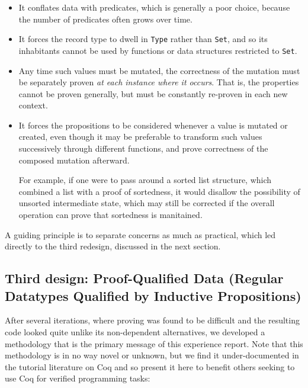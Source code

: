 \documentclass{llncs}
\begin{document}
\begin{itemize}
\item It conflates data with predicates, which is generally a poor choice,
  because the number of predicates often grows over time.

\item It forces the record type to dwell in \texttt{Type} rather than
  \texttt{Set}, and so its inhabitants cannot be used by functions or data
  structures restricted to \texttt{Set}.

\item Any time such values must be mutated, the correctness of the mutation
  must be separately proven \emph{at each instance where it occurs}.  That is,
  the properties cannot be proven generally, but must be constantly re-proven
  in each new context.

\item It forces the propositions to be considered whenever a value is mutated
  or created, even though it may be preferable to transform such values
  successively through different functions, and prove correctness of the
  composed mutation afterward.

  For example, if one were to pass around a sorted list structure, which
  combined a list with a proof of sortedness, it would disallow the
  possibility of unsorted intermediate state, which may still be corrected if
  the overall operation can prove that sortedness is manitained.
\end{itemize}

A guiding principle is to separate concerns as much as practical, which led
directly to the third redesign, discussed in the next section.  

\subsection{Third design: Proof-Qualified Data (Regular Datatypes Qualified by
  Inductive Propositions)}
\label{sec:splitdesign}

After several iterations, where proving was found to be difficult and
the resulting code looked quite unlike its non-dependent alternatives,
we developed a methodology that is the primary message of this
experience report.  Note that this methodology is in no way novel or
unknown, but we find it under-documented in the tutorial literature on
Coq and so present it here to benefit others seeking to use Coq for
verified programming tasks:
\end{document}
